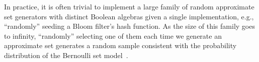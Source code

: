 \documentclass[ ../main.tex]{subfiles}
\begin{document}
In practice, it is often trivial to implement a large family 
of random approximate set
generators with distinct Boolean algebras given a single implementation, e.g.,
``randomly'' seeding a Bloom filter's hash function. As the size of this family
goes to infinity, ``randomly'' selecting one of them each time we generate an
approximate set generates a random sample consistent with the
probability distribution of the Bernoulli set model~\cite{bsets}.

\end{document}
